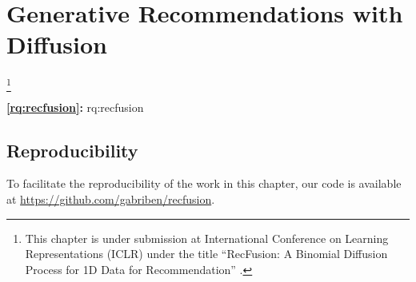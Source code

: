 
\acresetall

\chapter{Generative Recommendations with Diffusion}
\label{chapter:research-recfusion}

\footnote[]{This chapter is under submission at International Conference on Learning Representations (ICLR) under the title ``RecFusion: A Binomial Diffusion Process for 1D Data for Recommendation'' \citep{lucic2021cfgnnexplainer}.}
\acresetall


\medskip
\noindent
\textbf{\ref{rq:recfusion}:} \acl{rq:recfusion}
\medskip

\noindent




%
%
%
%
%
%
%
%
%



\section*{Reproducibility}
To facilitate the reproducibility of the work in this chapter, our code is available at \url{https://github.com/gabriben/recfusion}.








